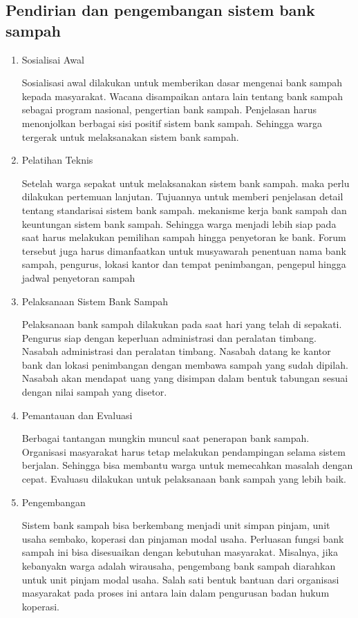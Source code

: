 \subsection{Pendirian dan pengembangan sistem bank sampah}
\begin{enumerate}
\item Sosialisai Awal

Sosialisasi awal dilakukan untuk memberikan dasar mengenai bank sampah kepada masyarakat. Wacana disampaikan antara lain tentang bank sampah sebagai program nasional, pengertian bank sampah. Penjelasan harus menonjolkan berbagai sisi positif sistem bank sampah. Sehingga warga tergerak untuk melaksanakan sistem bank sampah.

\item Pelatihan Teknis

Setelah warga sepakat untuk melaksanakan sistem bank sampah. maka perlu dilakukan pertemuan lanjutan. Tujuannya untuk memberi penjelasan detail tentang standarisai sistem bank sampah. mekanisme kerja bank sampah dan keuntungan sistem bank sampah. Sehingga warga menjadi lebih siap pada saat harus melakukan pemilihan sampah hingga penyetoran ke bank. Forum tersebut juga harus dimanfaatkan untuk musyawarah penentuan nama bank sampah, pengurus, lokasi kantor dan tempat penimbangan, pengepul hingga jadwal penyetoran sampah

\item Pelaksanaan Sistem Bank Sampah

Pelaksanaan bank sampah dilakukan pada saat hari yang telah di sepakati. Pengurus siap dengan keperluan administrasi dan peralatan timbang. Nasabah administrasi dan peralatan timbang. Nasabah datang ke kantor bank dan lokasi penimbangan dengan membawa sampah yang sudah dipilah. Nasabah akan mendapat uang yang disimpan dalam bentuk tabungan sesuai dengan nilai sampah yang disetor.

\item  Pemantauan dan Evaluasi

Berbagai tantangan mungkin muncul saat penerapan bank sampah. Organisasi masyarakat harus tetap melakukan pendampingan selama sistem berjalan. Sehingga bisa membantu warga untuk memecahkan masalah dengan cepat. Evaluasu dilakukan untuk pelaksanaan bank sampah yang lebih baik.

\item Pengembangan

Sistem bank sampah bisa berkembang menjadi unit simpan pinjam, unit usaha sembako, koperasi dan pinjaman modal usaha. Perluasan fungsi bank sampah ini bisa disesuaikan dengan kebutuhan masyarakat. Misalnya, jika kebanyakn warga adalah wirausaha, pengembang bank sampah diarahkan untuk unit pinjam modal usaha. Salah sati bentuk bantuan dari organisasi masyarakat pada proses ini antara lain dalam pengurusan badan hukum koperasi.
\end{enumerate}


